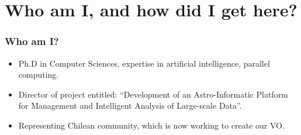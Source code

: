 \section{Who am I, and how did I get here?}

\begin{frame}
\frametitle{Who am I?}
\begin{itemize}
	\item Ph.D in Computer Sciences, expertise in artificial intelligence, parallel computing.
	\item Director of project entitled: ``Development of an Astro-Informatic Platform for Management and
		Intelligent Analysis of Large-scale Data''.
	\item Representing Chilean community, which is now working to create our VO.
\end{itemize}
\end{frame}
